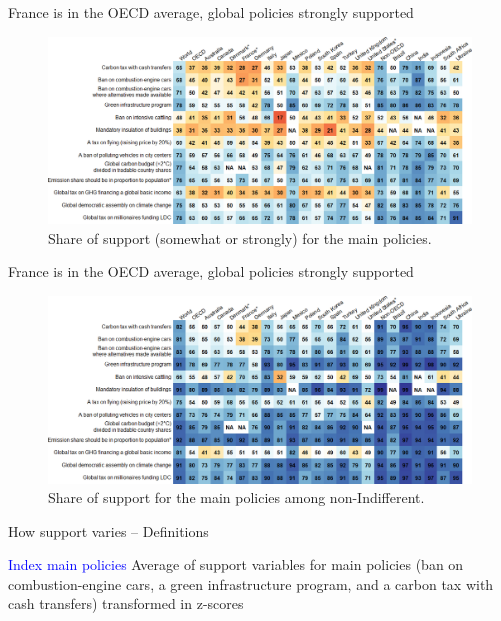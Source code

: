 \begin{framefont}{\small}
\begin{frame}{France is in the OECD average, global policies strongly supported}
	\begin{figure}[h!]
		\centering		
		\caption{Share of support (somewhat or strongly) for the main policies.}
		\includegraphics[width=\textwidth]{../figures/country_comparison/main_policies_positive_countries.png}
		\end{figure}
\end{frame}

\begin{frame}{France is in the OECD average, global policies strongly supported}
	\begin{figure}[h!]
		\centering		
		\caption{Share of support for the main policies among non-Indifferent.}
		\includegraphics[width=\textwidth]{../figures/country_comparison/main_policies_share_countries.png}
		\end{figure}
\end{frame}

\begin{frame}{How support varies -- Definitions}

\bbs
\ip \textcolor{blue}{Index main policies}
\bbs
\ip Average of support variables for main policies (ban on combustion-engine cars, a green infrastructure program, and a carbon tax with cash transfers) transformed in z-scores
\ee
\ee
\end{frame}


\end{framefont}
